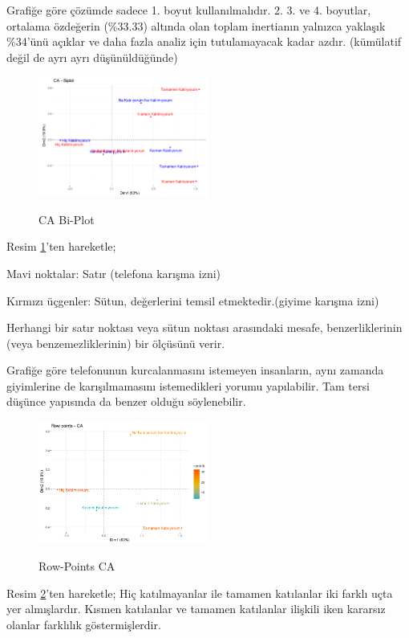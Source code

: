 \documentclass{article}
\begin{document}
Grafiğe göre çözümde sadece 1. boyut kullanılmalıdır. 2. 3. ve 4. boyutlar, ortalama özdeğerin (\%33.33) altında olan toplam inertianın yalnızca yaklaşık \%34’ünü açıklar ve daha fazla analiz için tutulamayacak kadar azdır. (kümülatif değil de ayrı ayrı düşünüldüğünde)

\begin{figure}[htbp]
    \centering
    \caption{CA Bi-Plot}
    \includegraphics[width=0.5\textwidth]{Imgs/bi-plot.png}
    \label{bi-plot}
\end{figure}

Resim \ref{bi-plot}'ten hareketle;

Mavi noktalar: Satır (telefona karışma izni)

Kırmızı üçgenler: Sütun, değerlerini temsil etmektedir.(giyime karışma izni)

Herhangi bir satır noktası veya sütun noktası arasındaki mesafe, benzerliklerinin (veya benzemezliklerinin) bir ölçüsünü verir.

Grafiğe göre telefonunun kurcalanmasını istemeyen insanların, aynı zamanda giyimlerine de karışılmamasını istemedikleri yorumu yapılabilir. Tam tersi düşünce yapısında da benzer olduğu söylenebilir.

\clearpage
\begin{figure}[htbp]
    \centering
    \caption{Row-Points CA}
    \includegraphics[width=0.5\textwidth]{Imgs/row-points.png}
    \label{row-plot}
\end{figure}

Resim \ref{row-plot}'ten hareketle;
Hiç katılmayanlar ile tamamen katılanlar iki farklı uçta yer almışlardır. Kısmen katılanlar ve tamamen katılanlar ilişkili iken kararsız olanlar farklılık göstermişlerdir.
\end{document}
